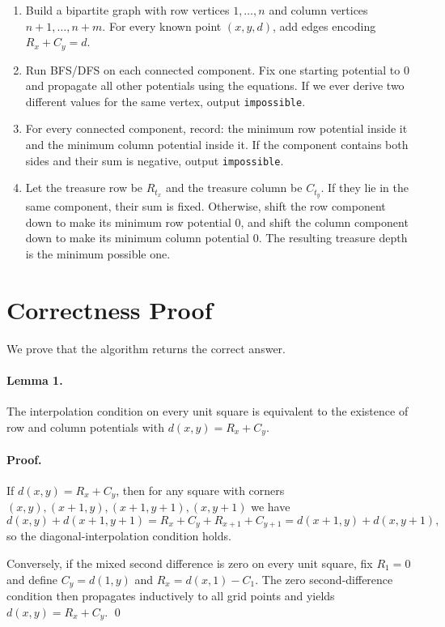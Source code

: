 \documentclass[11pt]{article}
\begin{document}
\begin{enumerate}[leftmargin=*]
    \item Build a bipartite graph with row vertices $1,\dots,n$ and column vertices $n+1,\dots,n+m$.
    For every known point $(x,y,d)$, add edges encoding $R_x + C_y = d$.
    \item Run BFS/DFS on each connected component.
    Fix one starting potential to $0$ and propagate all other potentials using the equations.
    If we ever derive two different values for the same vertex, output \texttt{impossible}.
    \item For every connected component, record:
    the minimum row potential inside it and the minimum column potential inside it.
    If the component contains both sides and their sum is negative, output \texttt{impossible}.
    \item Let the treasure row be $R_{t_x}$ and the treasure column be $C_{t_y}$.
    If they lie in the same component, their sum is fixed.
    Otherwise, shift the row component down to make its minimum row potential $0$, and shift the column
    component down to make its minimum column potential $0$.
    The resulting treasure depth is the minimum possible one.
\end{enumerate}

\section*{Correctness Proof}

We prove that the algorithm returns the correct answer.

\paragraph{Lemma 1.}
The interpolation condition on every unit square is equivalent to the existence of row and column
potentials with $d(x,y)=R_x+C_y$.

\paragraph{Proof.}
If $d(x,y)=R_x+C_y$, then for any square with corners $(x,y),(x+1,y),(x+1,y+1),(x,y+1)$ we have
\[
d(x,y)+d(x+1,y+1)=R_x+C_y+R_{x+1}+C_{y+1}
                  =d(x+1,y)+d(x,y+1),
\]
so the diagonal-interpolation condition holds.

Conversely, if the mixed second difference is zero on every unit square, fix $R_1=0$ and define
$C_y=d(1,y)$ and $R_x=d(x,1)-C_1$.
The zero second-difference condition then propagates inductively to all grid points and yields
$d(x,y)=R_x+C_y$. \qed
\end{document}
